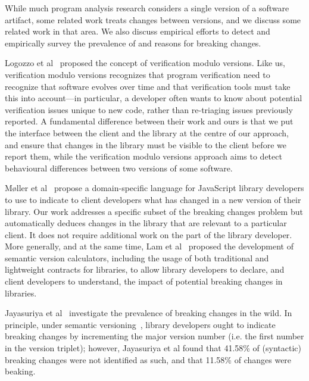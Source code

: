 While much program analysis research considers a single version of a software artifact, some related work treats changes between versions, and we discuss some related work in that area. We also discuss empirical efforts to detect and empirically survey the prevalence of and reasons for breaking changes.

Logozzo et al~\cite{logozzo14:_verif_modul_version} proposed the concept of verification modulo versions. Like us, verification modulo versions recognizes that program verification need to recognize that software evolves over time and that verification tools must take this into account---in particular, a developer often wants to know about potential verification issues unique to new code, rather than re-triaging issues previously reported. A fundamental difference between their work and ours is that we put the interface between the client and the library at the centre of our approach, and ensure that changes in the library must be visible to the client before we report them, while the verification modulo versions approach aims to detect behavioural differences between two versions of some software.

Møller et al~\cite{møller20:_detec_locat_javas_progr_affec} propose a domain-specific language for JavaScript library developers to use to indicate to client developers what has changed in a new version of their library. Our work addresses a specific subset of the breaking changes problem but automatically deduces changes in the library that are relevant to a particular client. It does not require additional work on the part of the library developer. More generally, and at the same time, Lam et al~\cite{lam20:_puttin_seman_seman_version} proposed the development of semantic version calculators, including the usage of both traditional and lightweight contracts for libraries, to allow library developers to declare, and client developers to understand, the impact of potential breaking changes in libraries.

Jayasuriya et al~\cite{jayasuriya23:_under_break_chang_wild,jayasuriya24} investigate the prevalence of breaking changes in the wild. In principle, under semantic versioning~\cite{preston-werner23:_seman_version}, library developers ought to indicate breaking changes by incrementing the major version number (i.e. the first number in the version triplet); however, Jayasuriya et al found that 41.58\% of (syntactic) breaking changes were not identified as such, and that 11.58\% of changes were beaking.

